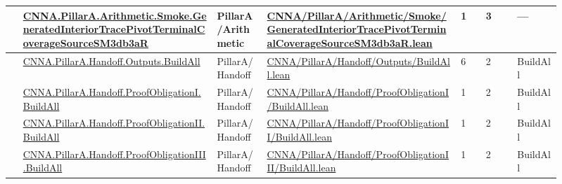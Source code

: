 \begin{longtable}{L{0.025\linewidth} L{0.315\linewidth} L{0.08\linewidth} L{0.315\linewidth} L{0.045\linewidth} L{0.055\linewidth} L{0.07\linewidth}}
\hline
{} & \href{run:repo_snapshot/CNNA/PillarA/Arithmetic/Smoke/GeneratedInteriorTracePivotTerminalCoverageSourceSM3db3aR.lean}{CNNA.\allowbreak{}PillarA.\allowbreak{}Arithmetic.\allowbreak{}Smoke.\allowbreak{}GeneratedInteriorTracePivotTerminalCoverageSourceSM3db3aR} & PillarA/\allowbreak{}Arithmetic & \href{run:repo_snapshot/CNNA/PillarA/Arithmetic/Smoke/GeneratedInteriorTracePivotTerminalCoverageSourceSM3db3aR.lean}{CNNA/\allowbreak{}PillarA/\allowbreak{}Arithmetic/\allowbreak{}Smoke/\allowbreak{}GeneratedInteriorTracePivotTerminalCoverageSourceSM3db3aR.\allowbreak{}lean} & 1 & 3 & ---\\
\hline
{} & \href{run:repo_snapshot/CNNA/PillarA/Handoff/Outputs/BuildAll.lean}{CNNA.\allowbreak{}PillarA.\allowbreak{}Handoff.\allowbreak{}Outputs.\allowbreak{}BuildAll} & PillarA/\allowbreak{}Handoff & \href{run:repo_snapshot/CNNA/PillarA/Handoff/Outputs/BuildAll.lean}{CNNA/\allowbreak{}PillarA/\allowbreak{}Handoff/\allowbreak{}Outputs/\allowbreak{}BuildAll.\allowbreak{}lean} & 6 & 2 & BuildAll\\
\hline
{} & \href{run:repo_snapshot/CNNA/PillarA/Handoff/ProofObligationI/BuildAll.lean}{CNNA.\allowbreak{}PillarA.\allowbreak{}Handoff.\allowbreak{}ProofObligationI.\allowbreak{}BuildAll} & PillarA/\allowbreak{}Handoff & \href{run:repo_snapshot/CNNA/PillarA/Handoff/ProofObligationI/BuildAll.lean}{CNNA/\allowbreak{}PillarA/\allowbreak{}Handoff/\allowbreak{}ProofObligationI/\allowbreak{}BuildAll.\allowbreak{}lean} & 1 & 2 & BuildAll\\
\hline
{} & \href{run:repo_snapshot/CNNA/PillarA/Handoff/ProofObligationII/BuildAll.lean}{CNNA.\allowbreak{}PillarA.\allowbreak{}Handoff.\allowbreak{}ProofObligationII.\allowbreak{}BuildAll} & PillarA/\allowbreak{}Handoff & \href{run:repo_snapshot/CNNA/PillarA/Handoff/ProofObligationII/BuildAll.lean}{CNNA/\allowbreak{}PillarA/\allowbreak{}Handoff/\allowbreak{}ProofObligationII/\allowbreak{}BuildAll.\allowbreak{}lean} & 1 & 2 & BuildAll\\
\hline
{} & \href{run:repo_snapshot/CNNA/PillarA/Handoff/ProofObligationIII/BuildAll.lean}{CNNA.\allowbreak{}PillarA.\allowbreak{}Handoff.\allowbreak{}ProofObligationIII.\allowbreak{}BuildAll} & PillarA/\allowbreak{}Handoff & \href{run:repo_snapshot/CNNA/PillarA/Handoff/ProofObligationIII/BuildAll.lean}{CNNA/\allowbreak{}PillarA/\allowbreak{}Handoff/\allowbreak{}ProofObligationIII/\allowbreak{}BuildAll.\allowbreak{}lean} & 1 & 2 & BuildAll\\

\end{longtable}
